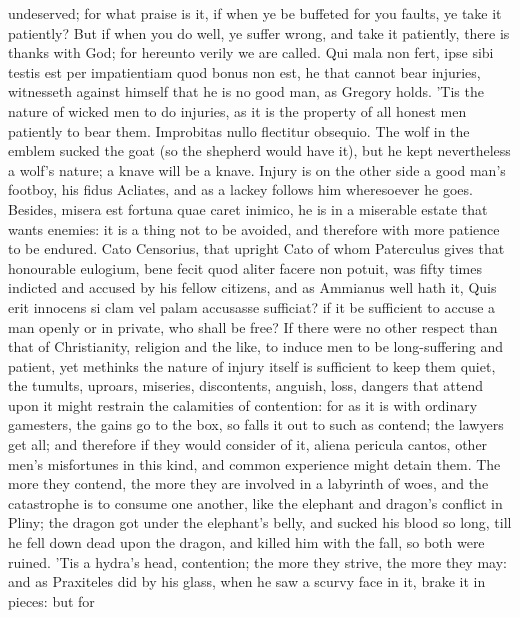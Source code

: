 {undeserved; for what praise is it, if when ye be buffeted for you
faults, ye take it patiently? But if when you do well, ye suffer wrong,
and take it patiently, there is thanks with God; for hereunto verily we
are called. Qui mala non fert, ipse sibi testis est per impatientiam
quod bonus non est, he that cannot bear injuries, witnesseth against
himself that he is no good man, as Gregory holds. 'Tis the nature
of wicked men to do injuries, as it is the property of all honest men
patiently to bear them. Improbitas nullo flectitur obsequio. The wolf
in the emblem sucked the goat (so the shepherd would have it),
but he kept nevertheless a wolf's nature; a knave will be a
knave. Injury is on the other side a good man's footboy, his fidus
Acliates, and as a lackey follows him wheresoever he goes. Besides,
misera est fortuna quae caret inimico, he is in a miserable estate that
wants enemies: it is a thing not to be avoided, and therefore
with more patience to be endured. Cato Censorius, that upright Cato of
whom Paterculus gives that honourable eulogium, bene fecit quod aliter
facere non potuit, was fifty times indicted and accused by his
fellow citizens, and as Ammianus well hath it, Quis erit innocens
si clam vel palam accusasse sufficiat? if it be sufficient to accuse a
man openly or in private, who shall be free? If there were no other
respect than that of Christianity, religion and the like, to induce men
to be long-suffering and patient, yet methinks the nature of injury
itself is sufficient to keep them quiet, the tumults, uproars,
miseries, discontents, anguish, loss, dangers that attend upon it might
restrain the calamities of contention: for as it is with ordinary
gamesters, the gains go to the box, so falls it out to such as contend;
the lawyers get all; and therefore if they would consider of it, aliena
pericula cantos, other men's misfortunes in this kind, and common
experience might detain them. The more they contend, the more
they are involved in a labyrinth of woes, and the catastrophe is to
consume one another, like the elephant and dragon's conflict in Pliny;
the dragon got under the elephant's belly, and sucked his blood
so long, till he fell down dead upon the dragon, and killed him with
the fall, so both were ruined. 'Tis a hydra's head, contention; the
more they strive, the more they may: and as Praxiteles did by his
glass, when he saw a scurvy face in it, brake it in pieces: but for
}
